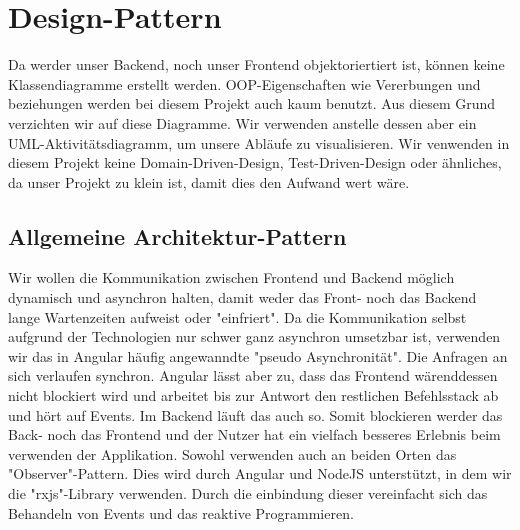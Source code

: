 	\section{Design-Pattern}
	Da werder unser Backend, noch unser Frontend objektoriertiert ist, können keine Klassendiagramme erstellt werden. OOP-Eigenschaften wie Vererbungen und beziehungen werden bei diesem Projekt auch kaum benutzt. Aus diesem Grund verzichten wir auf diese Diagramme. Wir verwenden anstelle dessen aber ein UML-Aktivitäts\-diagramm, um unsere Abläufe zu visualisieren. Wir venwenden in diesem Projekt keine Domain-Driven-Design, Test-Driven-Design oder ähnliches, da unser Projekt zu klein ist, damit dies den Aufwand wert wäre.

	\subsection{Allgemeine Architektur-Pattern}
	Wir wollen die Kommunikation zwischen Frontend und Backend möglich dynamisch und asynchron halten, damit weder das Front- noch das Backend lange Wartenzeiten aufweist oder "einfriert". Da die Kommunikation selbst aufgrund der Technologien nur schwer ganz asynchron umsetzbar ist, verwenden wir das in Angular häufig angewanndte "pseudo Asynchronität". Die Anfragen an sich verlaufen synchron. Angular lässt aber zu, dass das Frontend wärenddessen nicht blockiert wird und arbeitet bis zur Antwort den restlichen Befehlsstack ab und hört auf Events. Im Backend läuft das auch so. Somit blockieren werder das Back- noch das Frontend und der Nutzer hat ein vielfach besseres Erlebnis beim verwenden der Applikation. Sowohl verwenden auch an beiden Orten das "Observer"-Pattern. Dies wird durch Angular und NodeJS unterstützt, in dem wir die "rxjs"-Library verwenden. Durch die einbindung dieser vereinfacht sich das Behandeln von Events und das reaktive Programmieren.

